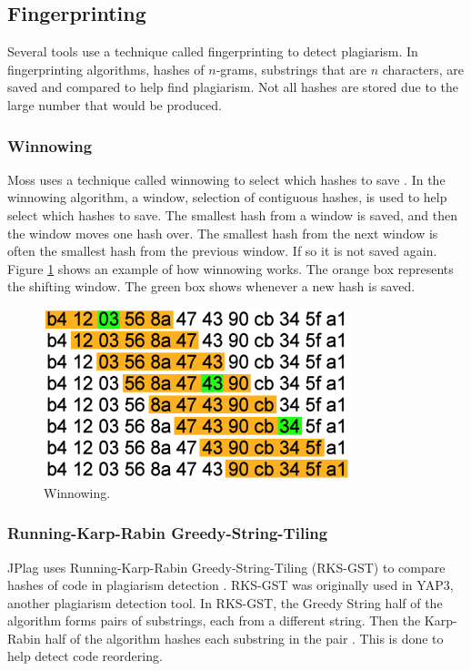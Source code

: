 \documentclass[10pt,journal,compsoc]{IEEEtran}
\begin{document}
		\subsection{Fingerprinting}
		Several tools use a technique called fingerprinting to detect plagiarism. In fingerprinting algorithms, hashes of $n$-grams, substrings that are $n$ characters, are saved and compared to help find plagiarism. Not all hashes are stored due to the large number that would be produced. 
		
			\subsubsection{Winnowing}
			Moss uses a technique called winnowing to select which hashes to save \cite{schleimer+wilkerson+aiken}. In the winnowing algorithm, a window, selection of contiguous hashes, is used to help select which hashes to save. The smallest hash from a window is saved, and then the window moves one hash over. The smallest hash from the next window is often the smallest hash from the previous window. If so it is not saved again. Figure \ref{fig:winnowing1} shows an example of how winnowing works. The orange box represents the shifting window. The green box shows whenever a new hash is saved.
		
			\begin{figure}[h!]
				\includegraphics[width=0.8\textwidth]{Winnowing.png}
				\caption{Winnowing.}
				\label{fig:winnowing1}
			\end{figure}
		
			\subsubsection{Running-Karp-Rabin Greedy-String-Tiling}
			JPlag uses Running-Karp-Rabin Greedy-String-Tiling (RKS-GST) to compare hashes of code in plagiarism detection \cite{prechelt+malpohl+philippsen}. RKS-GST was originally used in YAP3, another plagiarism detection tool. In RKS-GST, the Greedy String half of the algorithm forms pairs of substrings, each from a different string. Then the Karp-Rabin half of the algorithm hashes each substring in the pair \cite{wise}. This is done to help detect code reordering.
		
\end{document}

